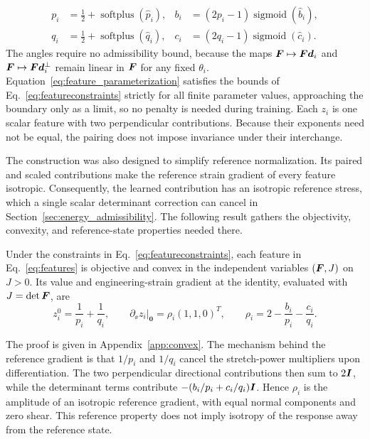 \begin{equation}
 \begin{aligned}
 p_i&=\tfrac12+\operatorname{softplus}(\widehat p_i),
 &b_i&=(2p_i-1)\operatorname{sigmoid}(\widehat b_i),\\
 q_i&=\tfrac12+\operatorname{softplus}(\widehat q_i),
 &c_i&=(2q_i-1)\operatorname{sigmoid}(\widehat c_i).
 \end{aligned}
 \label{eq:feature_parameterization}
\end{equation}
The angles require no admissibility bound, because the maps $\bm F\mapsto\bm F\bm d_i$ and $\bm F\mapsto\bm F\bm d_i^\perp$ remain linear in $\bm F$ for any fixed $\theta_i$. Equation~\eqref{eq:feature_parameterization} satisfies the bounds of Eq.~\eqref{eq:featureconstraints} strictly for all finite parameter values, approaching the boundary only as a limit, so no penalty is needed during training. Each $z_i$ is one scalar feature with two perpendicular contributions. Because their exponents need not be equal, the pairing does not impose invariance under their interchange.

The construction was also designed to simplify reference normalization. Its paired and scaled contributions make the reference strain gradient of every feature isotropic. Consequently, the learned contribution has an isotropic reference stress, which a single scalar determinant correction can cancel in Section~\ref{sec:energy_admissibility}. The following result gathers the objectivity, convexity, and reference-state properties needed there.

\begin{proposition}
\label{prop:paired_features}
Under the constraints in Eq.~\eqref{eq:featureconstraints}, each feature in Eq.~\eqref{eq:features} is objective and convex in the independent variables $(\bm F,J)$ on $J>0$. Its value and engineering-strain gradient at the identity, evaluated with $J=\det\bm F$, are
\begin{equation}
 z_i^0=\frac1{p_i}+\frac1{q_i},\qquad
 \partial_{\ee}z_i\big|_{\bm0}=\rho_i(1,1,0)^T,
 \qquad \rho_i=2-\frac{b_i}{p_i}-\frac{c_i}{q_i}.
 \label{eq:referencefeatures}
\end{equation}
\end{proposition}
The proof is given in Appendix~\ref{app:convex}. The mechanism behind the reference gradient is that $1/p_i$ and $1/q_i$ cancel the stretch-power multipliers upon differentiation. The two perpendicular directional contributions then sum to $2\bm I$, while the determinant terms contribute $-(b_i/p_i+c_i/q_i)\bm I$. Hence $\rho_i$ is the amplitude of an isotropic reference gradient, with equal normal components and zero shear. This reference property does not imply isotropy of the response away from the reference state.

